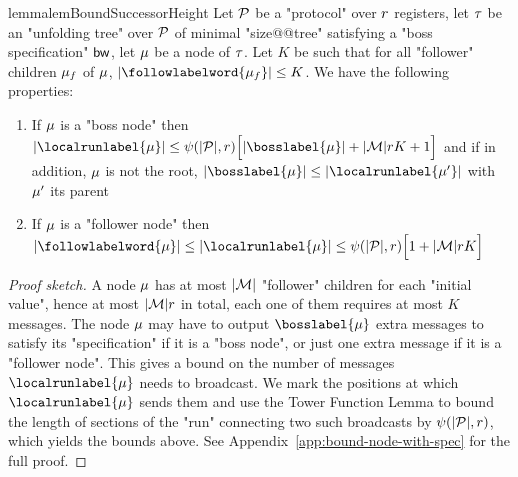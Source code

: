 \begin{restatable}{lemma}{lemBoundSuccessorHeight}
	\label{lem:bound-successor-height}
	Let $\mathcal{P}$ be a "protocol" over $r$ registers, let $\tau$ be an "unfolding tree" over $\mathcal{P}$ of minimal "size@@tree" satisfying a "boss specification" $\mathsf{bw}$, let $\mu$ be a node of $\tau$.
	Let $K$ be such that for all "follower" children $\mu_f$ of $\mu$, $\size{\followlabelword{\node_f}} \leq K$.
	We have the following properties:
	\begin{enumerate}				
		\item  If $\mu$ is a "boss node" then $\size{\localrunlabel{\node}} \leq \towerfun(\size{\prot},r)\Big[ \size{\bosslabel{\node}} + \size{\messages}rK +1 \Big]$ and if in addition, $\mu$ is not the root, $\size{\bosslabel{\node}} \leq \size{\localrunlabel{\node'}}$ with $\mu'$ its parent
%			
		
		\item If $\mu$ is a "follower node" then  $\size{\followlabelword{\node}} \leq \size{\localrunlabel{\node}} \leq \towerfun(\size{\prot},r)\Big[ 1 + \size{\messages}rK \Big]$
			
	\end{enumerate}
\end{restatable}

\begin{proof}[Proof sketch]
	A node $\mu$ has at most $|\mathcal{M}|$ "follower" children for each "initial value", hence at most $|\mathcal{M}|r$ in total, each one of them requires at most $K$ messages. The node $\mu$ may have to output $\bosslabel{\node}$ extra messages to satisfy its "specification" if it is a "boss node", or just one extra message if it is a "follower node".
	This gives a bound on the number of messages $\localrunlabel{\node}$ needs to broadcast. We mark the positions at which $\localrunlabel{\node}$ sends them and use the Tower Function Lemma to bound the length of sections of the "run" connecting two such broadcasts by $\psi(|\mathcal{P}|,r)$, which yields the bounds above. See Appendix~\ref{app:bound-node-with-spec} for the full proof.
\end{proof}

